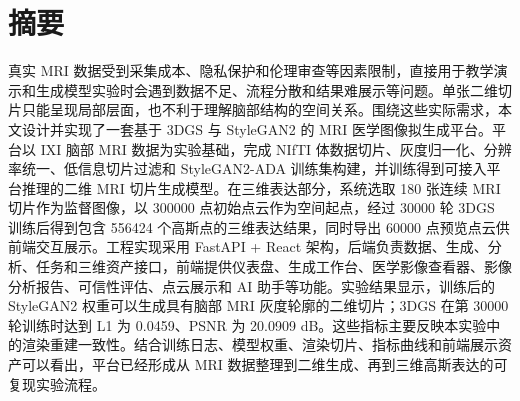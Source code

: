 \chapter*{\texorpdfstring{{\songti\bfseries\fontsize{16pt}{20pt}\selectfont 摘\quad 要}}{摘要}}
\thispagestyle{thesis-front}

{\songti\fontsize{12pt}{20pt}\selectfont
真实 MRI 数据受到采集成本、隐私保护和伦理审查等因素限制，直接用于教学演示和生成模型实验时会遇到数据不足、流程分散和结果难展示等问题。单张二维切片只能呈现局部层面，也不利于理解脑部结构的空间关系。围绕这些实际需求，本文设计并实现了一套基于 3DGS 与 StyleGAN2 的 MRI 医学图像拟生成平台。平台以 IXI 脑部 MRI 数据为实验基础，完成 NIfTI 体数据切片、灰度归一化、分辨率统一、低信息切片过滤和 StyleGAN2-ADA 训练集构建，并训练得到可接入平台推理的二维 MRI 切片生成模型。在三维表达部分，系统选取 180 张连续 MRI 切片作为监督图像，以 300000 点初始点云作为空间起点，经过 30000 轮 3DGS 训练后得到包含 556424 个高斯点的三维表达结果，同时导出 60000 点预览点云供前端交互展示。工程实现采用 FastAPI + React 架构，后端负责数据、生成、分析、任务和三维资产接口，前端提供仪表盘、生成工作台、医学影像查看器、影像分析报告、可信性评估、点云展示和 AI 助手等功能。实验结果显示，训练后的 StyleGAN2 权重可以生成具有脑部 MRI 灰度轮廓的二维切片；3DGS 在第 30000 轮训练时达到 L1 为 0.0459、PSNR 为 20.0909 dB。这些指标主要反映本实验中的渲染重建一致性。结合训练日志、模型权重、渲染切片、指标曲线和前端展示资产可以看出，平台已经形成从 MRI 数据整理到二维生成、再到三维高斯表达的可复现实验流程。
\par}

\vspace{1em}

